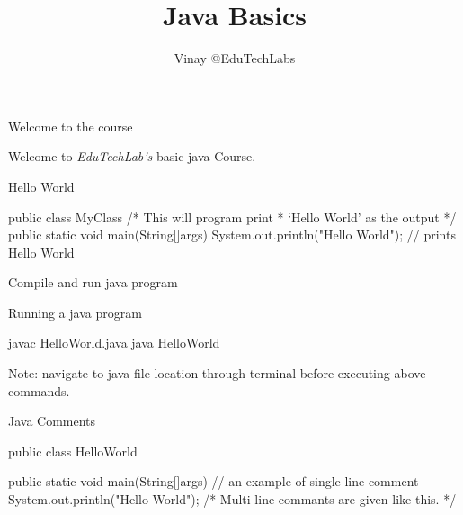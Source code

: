 \documentclass[11pt]{beamer}
\author{Vinay @EduTechLabs}
\title{Java Basics}
\begin{document}
\frame{\maketitle}
\begin{frame}{Welcome to the course}
	\begin{center}
	 Welcome to \emph{\color{pblue}EduTechLab's} basic java Course.
	\end{center}
\end{frame}


\pycode{%
\begin{java}

\end{java}
}



\begin{frame}[containsverbatim]{Hello World}
\begin{java}
public class MyClass{
/* This will program print 
 * `Hello World' as the output
 */
	public static void main(String[]args){
		System.out.println("Hello World"); 
		// prints Hello World
	}
}
\end{java}
\end{frame}

\begin{frame}[containsverbatim]{Compile and run java program}
	\begin{flushleft}
	
	
		\item{Running a java program} \\
		\begin{java}
		javac HelloWorld.java
		java HelloWorld
		\end{java}
		\item{Note: navigate to java file location through terminal before executing above commands.}
	\end{flushleft}
	
\end{frame}

\begin{frame}[containsverbatim]{Java Comments}
\begin{java}
public class HelloWorld{

public static void main(String[]args){
  // an example of single line comment
  System.out.println("Hello World");
  /* Multi line commants 
   are given like this. */
  }
}
\end{java}
\end{frame}
\end{document}
